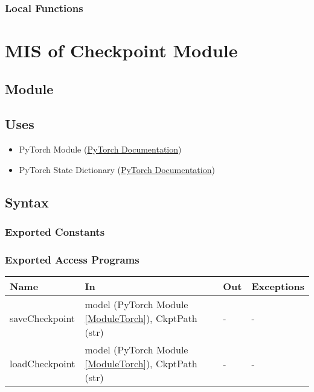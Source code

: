 \documentclass[12pt, titlepage]{article}
\begin{document}
\subsubsection{Local Functions}

\newpage

\section{MIS of Checkpoint Module} \label{ModuleCkpt} 

\subsection{Module}



\subsection{Uses}
\begin{itemize}
  \item PyTorch Module (\href{https://pytorch.org/docs/stable/generated/torch.nn.Module.html}{PyTorch Documentation})
  \item PyTorch State Dictionary (\href{https://pytorch.org/tutorials/beginner/saving_loading_models.html}{PyTorch Documentation})
\end{itemize}

\subsection{Syntax}



\subsubsection{Exported Constants}



\subsubsection{Exported Access Programs}

\begin{center}
\begin{tabular}{p{3cm}|p{5cm}|p{2cm}|p{2cm}}
\hline
\textbf{Name} & \textbf{In} & \textbf{Out} & \textbf{Exceptions} \\
\hline
saveCheckpoint & model (PyTorch Module \ref{ModuleTorch}), CkptPath (str) & - & - \\
\hline
loadCheckpoint & model (PyTorch Module \ref{ModuleTorch}), CkptPath (str) & - & - \\
\hline
\end{tabular}
\end{center}
\end{document}
